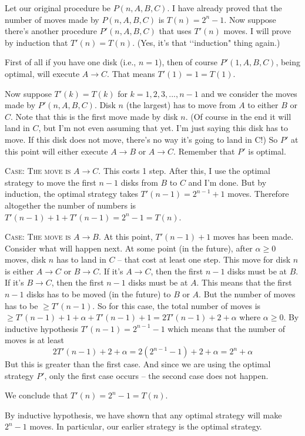 Let our original procedure be $P(n, A, B, C)$. I have already proved
that the number of moves made by $P(n, A, B, C)$ is $T(n) = 2^n - 1$.
Now suppose there's another procedure $P'(n, A, B, C)$ that uses
$T'(n)$ moves. I will prove by induction that $T'(n) = T(n)$.
(Yes, it's that \lq\lq induction" thing again.)

First of all if you have one disk (i.e., $n = 1$), then of course
$P'(1, A, B, C)$, being optimal, will execute $A \rightarrow C$.
That means $T'(1) = 1 = T(1)$.

Now suppose $T'(k) = T(k)$ for $k = 1, 2, 3, ..., n - 1$
and we consider the moves made by $P'(n, A, B, C)$.
Disk $n$ (the largest) has to move from $A$ to either $B$ or $C$.
Note that this is the first move made by disk $n$.
(Of course in the end it will land in $C$, but I'm not even assuming that yet.
I'm just saying this disk has to move.
If this disk does not move, there's no way it's going to land in C!)
So $P'$ at this point will either execute $A \rightarrow B$
or $A \rightarrow C$.
Remember that $P'$ is optimal.

\textsc{Case: The move is $A\rightarrow C$.}
This costs 1 step.
After this, I use the optimal strategy to move the first $n - 1$ disks
from $B$ to $C$ and I'm done.
But by induction, the optimal strategy takes
$T'(n-1) = 2^{n - 1} + 1$ moves.
Therefore altogether the number of numbers is
$T'(n - 1) + 1 + T'(n-1) = 2^n - 1 = T(n)$.

\textsc{Case: The move is $A\rightarrow B$.}
At this point, $T'(n-1) + 1$ moves has been made.
Consider what will happen next.
At some point (in the future), after $\alpha \geq 0$ moves, 
disk $n$ has to land in $C$ -- that cost at least one step.
This move for disk $n$ is either $A \rightarrow C$ or $B \rightarrow C$.
If it's $A \rightarrow C$, then the first $n - 1$ disks must be at $B$.
If it's $B \rightarrow C$, then the first $n - 1$ disks must be at $A$.
This means that the first $n - 1$ disks has to be moved (in the future)
to $B$ or $A$.
But the number of moves has to be $\geq T'(n-1)$.
So for this case, the total number of moves is
$\geq T'(n-1) + 1 + \alpha + T'(n-1) + 1 = 2T'(n-1) + 2 + \alpha$ where
$\alpha \geq 0$.
By inductive hypothesis $T'(n-1) = 2^{n-1} - 1$ which means that 
the number of moves is at least
\[
2T'(n - 1) + 2 + \alpha = 2(2^{n-1} - 1) + 2 + \alpha = 2^n + \alpha
\]
But this is greater than the first case.
And since we are using the optimal strategy $P'$, only the first case occurs
-- the second case does
not happen.

We conclude that $T'(n) = 2^n - 1 = T(n)$.

By inductive hypothesis, we have shown that any optimal strategy will
make $2^n - 1$ moves.
In particular, our earlier strategy is the optimal strategy.
